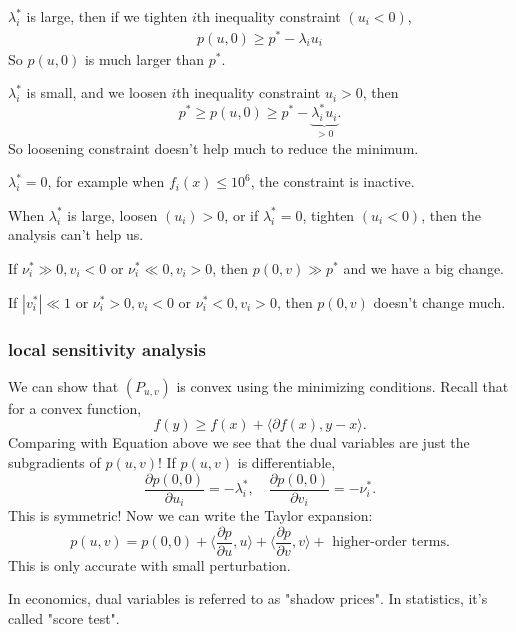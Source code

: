 \documentclass[class=article,crop=false]{standalone}
\begin{document}
\begin{case}[1]
	$ \lambda_i^* $ is large, then if we tighten $ i$th inequality constraint  $ (u_i<0)$,
	\begin{align*}
		p(u,0) \geq p^* - \lambda_i u_i
	\end{align*}
	So $ p(u,0)$ is much larger than  $ p^* $.
\end{case}
\begin{case}[2]
$ \lambda_i^* $ is small, and we loosen $ i$th inequality constraint  $ u_i>0$, then
\[
	p^* \geq p(u,0)\geq p^* - \underbrace{\lambda_i^* u_i}_{>0}
.\] 
So loosening constraint doesn't help much to reduce the minimum.
\end{case}
\begin{case}[3]
	$ \lambda_i^* =0$, for example when $ f_i(x)\leq 10^{6}$, the constraint is inactive.
\end{case}
\begin{case}[4]
	When $ \lambda_i^* $ is large, loosen $ (u_i)>0$, or if $ \lambda_i^* =0$, tighten $ (u_i<0)$, then the analysis can't help us.
\end{case}
\begin{case}[5]
	If $ \nu_i^* \gg 0, v_i<0$ or $ \nu_i^* \ll 0, v_i>0$, then $ p(0,v) \gg p^* $ and we have a big change.
\end{case}
\begin{case}[6]
	If $ |v_i^* | \ll 1$ or $ \nu_i^* >0,v_i<0$ or $ \nu_i^* <0, v_i>0$, then $ p(0,v)$ doesn't change much.
\end{case}
\subsubsection{local sensitivity analysis}
We can show that $ (P_{u,v})$ is convex using the minimizing conditions. Recall that for a convex function,
 \[
	 f(y) \geq f(x) + \langle \partial f(x) , y-x \rangle
.\] 
Comparing with Equation above we see that the dual variables are just the subgradients of $ p(u,v)$!
If $ p(u,v)$ is differentiable,
 \[
	 \frac{\partial p(0,0)}{\partial u_i} = -\lambda_i^* , \quad \frac{\partial p(0,0)}{\partial v_i} =-\nu_i^*  
.\] 
This is symmetric! Now we can write the Taylor expansion:
\[
	p(u,v) = p(0,0) +\langle \frac{\partial p}{\partial u} ,u \rangle + \langle \frac{\partial p}{\partial v} ,v \rangle + \text{ higher-order terms} 
.\]
This is only accurate with small perturbation.

In economics, dual variables is referred to as "shadow prices". In statistics, it's called "score test".
\end{document}
